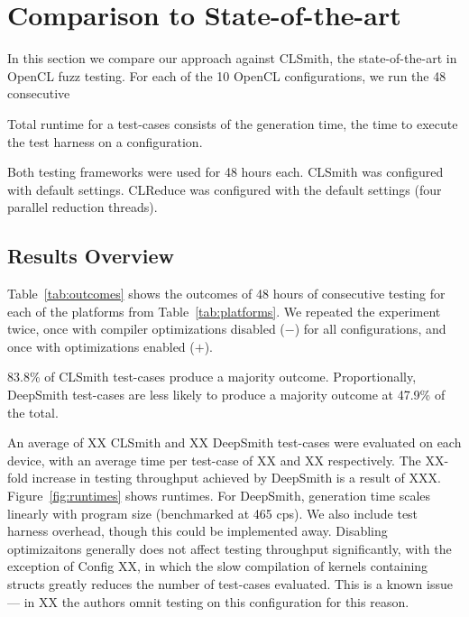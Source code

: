 \section{Comparison to State-of-the-art}\label{sec:vs_clsmith}

In this section we compare our approach against CLSmith, the state-of-the-art in OpenCL fuzz testing. For each of the 10 OpenCL configurations, we run the  48 consecutive

Total runtime for a test-cases consists of the generation time, the time to execute the test harness on a configuration.

Both testing frameworks were used for 48 hours each. CLSmith was configured with default settings. CLReduce was configured with the default settings (four parallel reduction threads).

%

\subsection{Results Overview}

Table~\ref{tab:outcomes} shows the outcomes of 48 hours of consecutive testing for each of the platforms from Table~\ref{tab:platforms}. We repeated the experiment twice, once with compiler optimizations disabled ($-$) for all configurations, and once with optimizations enabled ($+$).

83.8\% of CLSmith test-cases produce a majority \textbf{\cmark} outcome. Proportionally, DeepSmith test-cases are less likely to produce a majority outcome at 47.9\% of the total.

An average of XX CLSmith and XX DeepSmith test-cases were evaluated on each device, with an average time per test-case of XX and XX respectively. The XX-fold increase in testing throughput achieved by DeepSmith is a result of XXX. Figure~\ref{fig:runtimes} shows runtimes. For DeepSmith, generation time scales linearly with program size (benchmarked at 465 cps). We also include test harness overhead, though this could be implemented away. Disabling optimizaitons generally does not affect testing throughput significantly, with the exception of Config XX, in which the slow compilation of kernels containing structs greatly reduces the number of test-cases evaluated. This is a known issue --- in XX the authors omnit testing on this configuration for this reason.

